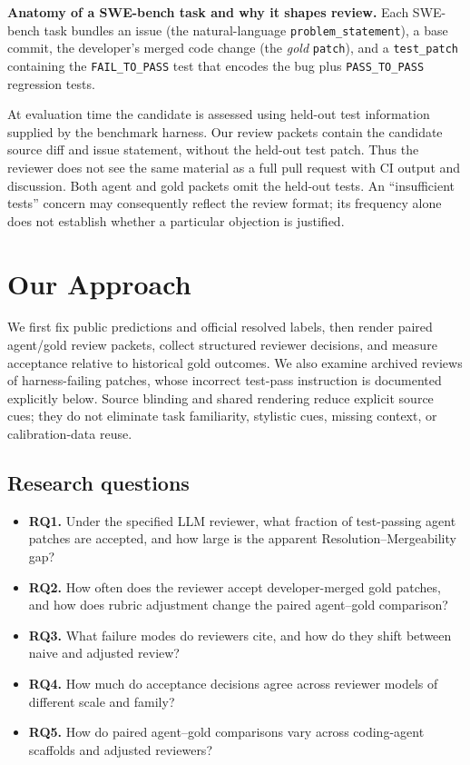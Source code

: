 \documentclass[10pt,conference]{IEEEtran}
\begin{document}
\textbf{Anatomy of a SWE-bench task and why it shapes review.} Each SWE-bench task bundles an
issue (the natural-language \texttt{problem\_statement}), a base commit, the developer's merged
code change (the \emph{gold} \texttt{patch}), and a \texttt{test\_patch} containing the
\texttt{FAIL\_TO\_PASS} test that encodes the bug plus \texttt{PASS\_TO\_PASS} regression tests.

At evaluation time the candidate is assessed using held-out test information supplied by
the benchmark harness. Our review packets contain the candidate source diff and issue
statement, without the held-out test patch. Thus the reviewer does not see the same material
as a full pull request with CI output and discussion. Both agent and gold packets omit the
held-out tests. An ``insufficient tests'' concern may consequently reflect the review format;
its frequency alone does not establish whether a particular objection is justified.

\section{Our Approach}
\label{sec:design}

We first fix public predictions and official resolved labels, then render paired agent/gold
review packets, collect structured reviewer decisions, and measure acceptance relative to
historical gold outcomes. We also examine archived reviews of harness-failing patches,
whose incorrect test-pass instruction is documented explicitly below. Source blinding and
shared rendering reduce explicit source cues; they do not eliminate task familiarity,
stylistic cues, missing context, or calibration-data reuse.

\subsection{Research questions}
\begin{itemize}
\item \textbf{RQ1.} Under the specified LLM reviewer, what fraction of test-passing agent
patches are accepted, and how large is the apparent Resolution--Mergeability gap?
\item \textbf{RQ2.} How often does the reviewer accept developer-merged gold patches, and how does rubric adjustment change the paired agent--gold comparison?
\item \textbf{RQ3.} What failure modes do reviewers cite, and how do they shift between naive and
adjusted review?
\item \textbf{RQ4.} How much do acceptance decisions agree across reviewer models of
different scale and family?
\item \textbf{RQ5.} How do paired agent--gold comparisons vary across coding-agent scaffolds and adjusted reviewers?
\end{itemize}
\end{document}
